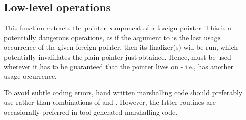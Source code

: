 \subsection{Low-level operations}
\begin{haddockdesc}
\item[\begin{tabular}{@{}l}
unsafeForeignPtrToPtr :: ForeignPtr a -> Ptr a
\end{tabular}]
{\haddockbegindoc
This function extracts the pointer component of a foreign
 pointer.  This is a potentially dangerous operations, as if the
 argument to  is the last usage
 occurrence of the given foreign pointer, then its finalizer(s) will
 be run, which potentially invalidates the plain pointer just
 obtained.  Hence,  must be used
 wherever it has to be guaranteed that the pointer lives on - i.e.,
 has another usage occurrence.\par
To avoid subtle coding errors, hand written marshalling code
 should preferably use  rather
 than combinations of  and
 .  However, the latter routines
 are occasionally preferred in tool generated marshalling code.\par}
\end{haddockdesc}
